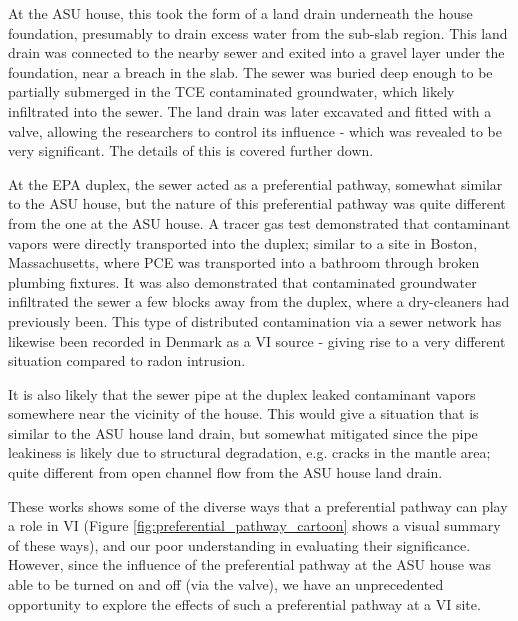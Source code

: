 At the ASU house, this took the form of a land drain underneath the house foundation, presumably to drain excess water from the sub-slab region.
This land drain was connected to the nearby sewer and exited into a gravel layer under the foundation, near a breach in the slab.
The sewer was buried deep enough to be partially submerged in the TCE contaminated groundwater, which likely infiltrated into the sewer.
The land drain was later excavated and fitted with a valve, allowing the researchers to control its influence - which was revealed to be very significant\cite{guo_identification_2015}.
The details of this is covered further down.\par

At the EPA duplex, the sewer acted as a preferential pathway, somewhat similar to the ASU house, but the nature of this preferential pathway was quite different from the one at the ASU house.
A tracer gas test demonstrated that contaminant vapors were directly transported into the duplex\cite{mchugh_evidence_2017}; similar to a site in Boston, Massachusetts, where PCE was transported into a bathroom through broken plumbing fixtures\cite{pennell_sewer_2013}.
It was also demonstrated that contaminated groundwater infiltrated the sewer a few blocks away from the duplex, where a dry-cleaners had  previously been.
This type of distributed contamination via a sewer network has likewise been recorded in Denmark\cite{nielsen_remediation_2017} as a VI source - giving rise to a very different situation compared to radon intrusion.\par

It is also likely that the sewer pipe at the duplex leaked contaminant vapors somewhere near the vicinity of the house.
This would give a situation that is similar to the ASU house land drain, but somewhat mitigated since the pipe leakiness is likely due to structural degradation, e.g. cracks in the mantle area; quite different from open channel flow from the ASU house land drain.\par

These works shows some of the diverse ways that a preferential pathway can play a role in VI (Figure \ref{fig:preferential_pathway_cartoon} shows a visual summary of these ways), and our poor understanding in evaluating their significance.
However, since the influence of the preferential pathway at the ASU house was able to be turned on and off (via the valve), we have an unprecedented opportunity to explore the effects of such a preferential pathway at a VI site.\par

